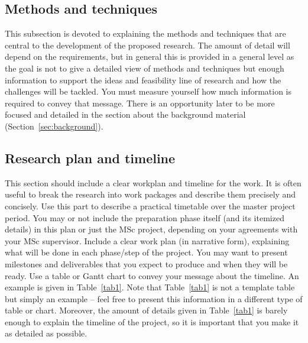 \documentclass{article}
\begin{document}
\subsection{Methods and techniques}

This subsection is devoted to explaining the methods and techniques that are central to the development of the proposed research. The amount of detail will depend on the requirements, but in general this is provided in a general level as the goal is not to give a detailed view of methods and techniques but enough information to support the ideas and feasibility line of research and how the challenges will be tackled. You must measure yourself how much information is required to convey that message. There is an opportunity later to be more focused and detailed in the section about the background material (Section~\ref{sec:background}).

\subsection{Research plan and timeline}
This section should include a clear workplan and timeline for the work. It is often useful to break the research into work packages and describe them precisely and concisely. Use this part to describe a practical timetable over the master project period. You may or not include the preparation phase itself (and its itemized details) in this plan or just the MSc project, depending on your agreements with your MSc supervisor. Include a clear work plan (in narrative form), explaining what will be done in each phase/step of the project. You may want to present milestones and deliverables that you expect to produce and when they will be ready. Use a table or Gantt chart to convey your message about the timeline. An example is given in Table~\ref{tab1}. Note that Table~\ref{tab1} is not a template table but simply an example -- feel free to present this information in a different type of table or chart. Moreover, the amount of details given in Table~\ref{tab1} is barely enough to explain the timeline of the project, so it is important that you make it as detailed as possible.
\end{document}
